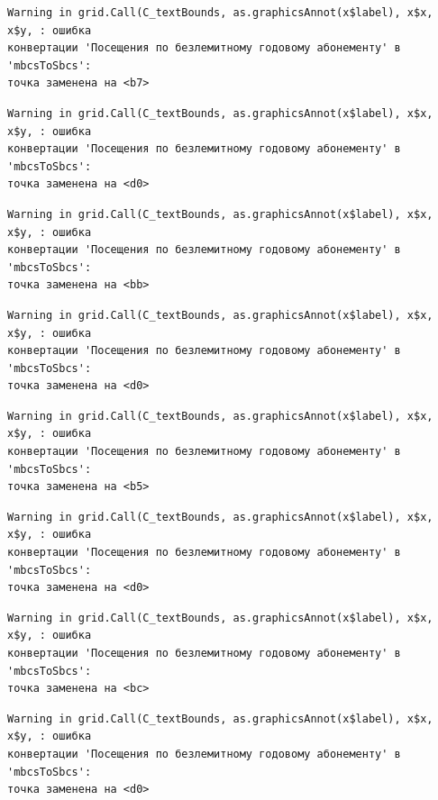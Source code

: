 \documentclass[
  letterpaper,
  DIV=11,
  numbers=noendperiod]{scrreprt}
\begin{document}
\begin{verbatim}
Warning in grid.Call(C_textBounds, as.graphicsAnnot(x$label), x$x, x$y, : ошибка
конвертации 'Посещения по безлемитному годовому абонементу' в 'mbcsToSbcs':
точка заменена на <b7>
\end{verbatim}

\begin{verbatim}
Warning in grid.Call(C_textBounds, as.graphicsAnnot(x$label), x$x, x$y, : ошибка
конвертации 'Посещения по безлемитному годовому абонементу' в 'mbcsToSbcs':
точка заменена на <d0>
\end{verbatim}

\begin{verbatim}
Warning in grid.Call(C_textBounds, as.graphicsAnnot(x$label), x$x, x$y, : ошибка
конвертации 'Посещения по безлемитному годовому абонементу' в 'mbcsToSbcs':
точка заменена на <bb>
\end{verbatim}

\begin{verbatim}
Warning in grid.Call(C_textBounds, as.graphicsAnnot(x$label), x$x, x$y, : ошибка
конвертации 'Посещения по безлемитному годовому абонементу' в 'mbcsToSbcs':
точка заменена на <d0>
\end{verbatim}

\begin{verbatim}
Warning in grid.Call(C_textBounds, as.graphicsAnnot(x$label), x$x, x$y, : ошибка
конвертации 'Посещения по безлемитному годовому абонементу' в 'mbcsToSbcs':
точка заменена на <b5>
\end{verbatim}

\begin{verbatim}
Warning in grid.Call(C_textBounds, as.graphicsAnnot(x$label), x$x, x$y, : ошибка
конвертации 'Посещения по безлемитному годовому абонементу' в 'mbcsToSbcs':
точка заменена на <d0>
\end{verbatim}

\begin{verbatim}
Warning in grid.Call(C_textBounds, as.graphicsAnnot(x$label), x$x, x$y, : ошибка
конвертации 'Посещения по безлемитному годовому абонементу' в 'mbcsToSbcs':
точка заменена на <bc>
\end{verbatim}

\begin{verbatim}
Warning in grid.Call(C_textBounds, as.graphicsAnnot(x$label), x$x, x$y, : ошибка
конвертации 'Посещения по безлемитному годовому абонементу' в 'mbcsToSbcs':
точка заменена на <d0>
\end{verbatim}
\end{document}
